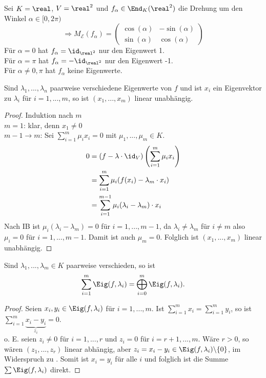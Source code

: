 \begin{example}
	Sei $K=\real$, $V=\real^2$ und $f_{\alpha}\in\End_K(\real^2)$ die Drehung um den Winkel $\alpha\in [0,2\pi)$ \\
	\[\Rightarrow M_{\mathcal{E}}(f_{\alpha})=\begin{pmatrix}\cos(\alpha)&-\sin(\alpha) \\ \sin(\alpha) & \cos(\alpha)\end{pmatrix}\]
	Für $\alpha=0$ hat $f_{\alpha}=\id_{\real^2}$ nur den Eigenwert 1. \\
	Für $\alpha=\pi$ hat $f_{\alpha}=-\id_{\real^2}$ nur den Eigenwert -1. \\
	Für $\alpha\neq 0,\pi$ hat $f_{\alpha}$ keine Eigenwerte. %
\end{example}

\begin{lemma}
	Sind $\lambda_1,...,\lambda_n$ paarweise verschiedene Eigenwerte von $f$ und ist $x_i$ ein Eigenvektor zu $\lambda_i$ für $i=1,...,m$, so ist $(x_1,...,x_m)$ linear unabhängig.
\end{lemma}
\begin{proof}
	Induktion nach $m$\\
	\emph{$m=1$}: klar, denn $x_1\neq 0$ \\
	\emph{$m-1\to m$}: Sei $\sum_{i=1}^m \mu_i x_i=0$ mit $\mu_1,...,\mu_m\in K$.
	\begin{align}
		0&= (f-\lambda\cdot\id_V)\left( \sum\limits_{i=1}^m \mu_i x_i\right) \notag \\
		&= \sum\limits_{i=1}^m \mu_i(f(x_i)-\lambda_m\cdot x_i) \notag \\
		&= \sum\limits_{i=1}^{m-1} \mu_i(\lambda_i-\lambda_m)\cdot x_i \notag
	\end{align} 
	Nach IB ist $\mu_i(\lambda_i-\lambda_m)=0$ für $i=1,...,m-1$, da $\lambda_i\neq\lambda_m$ für $i\neq m$ also $\mu_i=0$ für $i=1,...,m-1$. Damit ist auch $\mu_m=0$. Folglich ist $(x_1,...,x_m)$ linear unabhängig.
\end{proof}

\begin{proposition}
	Sind $\lambda_1,...,\lambda_m\in K$ paarweise verschieden, so ist 
	\[\sum\limits_{i=1}^m \Eig(f,\lambda_i)=\bigoplus_{i=0}^{m}\Eig(f,\lambda_i).\]
\end{proposition}
\begin{proof}
	Seien $x_i,y_i\in\Eig(f,\lambda_i)$ für $i=1,...,m$. Ist $\sum_{i=1}^m x_i=\sum_{i=1}^m y_i$, so ist $\sum_{i=1}^m \underbrace{x_i-y_i}_{z_i}=0$.\\
	o. E. seien $z_i\neq 0$ für $i=1,...,r$ und $z_i=0$ für $i=r+1,...,m$. Wäre $r>0$, so wären $(z_1,...,z_r)$ linear abhängig, aber $z_i=x_i-y_i\in\Eig(f,\lambda_i)\backslash\{0\}$, im Widerspruch zu . Somit ist $x_i=y_i$ für alle $i$ und folglich ist die Summe $\sum\Eig(f,\lambda_i)$ direkt.
\end{proof}

